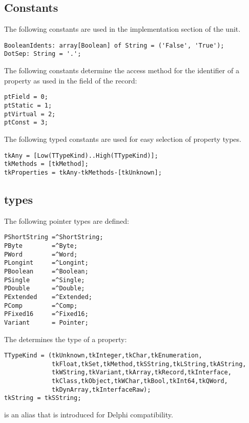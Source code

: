 \subsection{Constants}
The following constants are used in the implementation section of the unit.

\begin{verbatim}
BooleanIdents: array[Boolean] of String = ('False', 'True');
DotSep: String = '.';
\end{verbatim}
The following constants determine the access method for the  
identifier of a property as used in the  field of the 
 record:
\begin{verbatim}
ptField = 0;
ptStatic = 1;
ptVirtual = 2;
ptConst = 3;
\end{verbatim}
The following typed constants are used for easy selection of property types.
\begin{verbatim}
tkAny = [Low(TTypeKind)..High(TTypeKind)];
tkMethods = [tkMethod];
tkProperties = tkAny-tkMethods-[tkUnknown];
\end{verbatim}

\subsection{types}
The following pointer types are defined:
\begin{verbatim}
PShortString =^ShortString;
PByte        =^Byte;
PWord        =^Word;
PLongint     =^Longint;
PBoolean     =^Boolean;
PSingle      =^Single;
PDouble      =^Double;
PExtended    =^Extended;
PComp        =^Comp;
PFixed16     =^Fixed16;
Variant      = Pointer;
\end{verbatim}

The  determines the type of a property:
\begin{verbatim}
TTypeKind = (tkUnknown,tkInteger,tkChar,tkEnumeration,
             tkFloat,tkSet,tkMethod,tkSString,tkLString,tkAString,
             tkWString,tkVariant,tkArray,tkRecord,tkInterface,
             tkClass,tkObject,tkWChar,tkBool,tkInt64,tkQWord,
             tkDynArray,tkInterfaceRaw);
tkString = tkSString;
\end{verbatim}
 is an alias that is introduced for Delphi compatibility.

